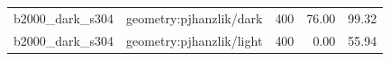 \begin{longtable}{l>{\raggedright\arraybackslash}p{.42\linewidth}rrr}
b2000\_\allowbreak{}dark\_\allowbreak{}s304 & %
geometry:pjhanzlik/dark & %
400 & %
76.00 & %
99.32 \\ %

b2000\_\allowbreak{}dark\_\allowbreak{}s304 & %
geometry:pjhanzlik/light & %
400 & %
0.00 & %
55.94 \\ %


\end{longtable}
